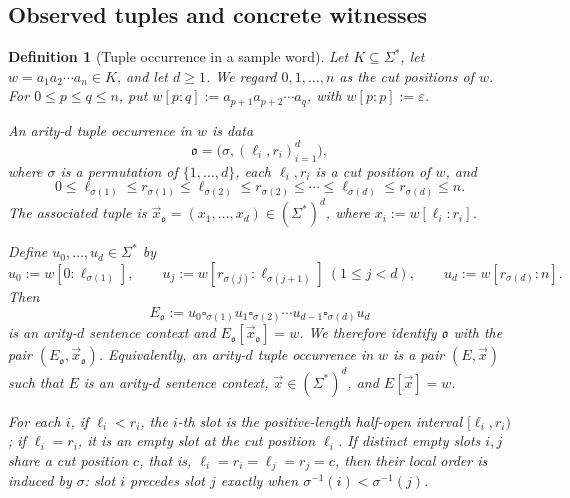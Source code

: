 \documentclass[11pt,a4paper]{article}
\newtheorem{definition}[theorem]{Definition}
\theoremstyle{remark}
\newcommand{\tuple}[1]{\vec{#1}}
\newcommand{\blank}{\square}
\newcommand{\eps}{\varepsilon}
\begin{document}
\subsection{Observed tuples and concrete witnesses}

\begin{definition}[Tuple occurrence in a sample word]
\label{def:tuple-occurrence}
Let \(K\subseteq\Sigma^*\), let \(w=a_1a_2\cdots a_n\in K\), and let
\(d\ge1\).  We regard \(0,1,\ldots,n\) as the cut positions of \(w\).  For
\(0\le p\le q\le n\), put
\(w[p:q]:=a_{p+1}a_{p+2}\cdots a_q\), with \(w[p:p]:=\eps\).

An \emph{arity-\(d\) tuple occurrence} in \(w\) is data
\[
  \mathfrak o=\bigl(\sigma,(\ell_i,r_i)_{i=1}^d\bigr),
\]
where \(\sigma\) is a permutation of \(\{1,\ldots,d\}\), each
\(\ell_i,r_i\) is a cut position of \(w\), and
\[
  0\le \ell_{\sigma(1)}\le r_{\sigma(1)}\le
  \ell_{\sigma(2)}\le r_{\sigma(2)}\le\cdots\le
  \ell_{\sigma(d)}\le r_{\sigma(d)}\le n.
\]
The associated tuple is
\(\tuple x_{\mathfrak o}=(x_1,\ldots,x_d)\in(\Sigma^*)^d\), where
\(x_i:=w[\ell_i:r_i]\).

Define \(u_0,\ldots,u_d\in\Sigma^*\) by
\[
  u_0:=w[0:\ell_{\sigma(1)}],\qquad
  u_j:=w[r_{\sigma(j)}:\ell_{\sigma(j+1)}]\ (1\le j<d),\qquad
  u_d:=w[r_{\sigma(d)}:n].
\]
Then
\[
  E_{\mathfrak o}:=
  u_0\blank_{\sigma(1)}u_1\blank_{\sigma(2)}\cdots
  u_{d-1}\blank_{\sigma(d)}u_d
\]
is an arity-\(d\) sentence context and
\(E_{\mathfrak o}[\tuple x_{\mathfrak o}]=w\).  We therefore identify
\(\mathfrak o\) with the pair
\((E_{\mathfrak o},\tuple x_{\mathfrak o})\).  Equivalently, an arity-\(d\)
tuple occurrence in \(w\) is a pair \((E,\tuple x)\) such that \(E\) is an
arity-\(d\) sentence context, \(\tuple x\in(\Sigma^*)^d\), and
\(E[\tuple x]=w\).

For each \(i\), if \(\ell_i<r_i\), the \(i\)-th slot is the positive-length
half-open interval \([\ell_i,r_i)\); if \(\ell_i=r_i\), it is an empty slot at
the cut position \(\ell_i\).  If distinct empty slots \(i,j\) share a cut
position \(c\), that is,
\(\ell_i=r_i=\ell_j=r_j=c\), then their local order is induced by \(\sigma\):
slot \(i\) precedes slot \(j\) exactly when
\(\sigma^{-1}(i)<\sigma^{-1}(j)\).
\end{definition}
\end{document}
